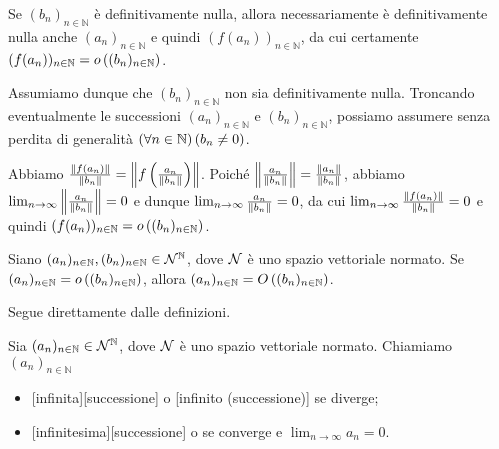 \Proof Se $(b_n)_{n \in \mathbb{N}}$ \`e definitivamente nulla, allora necessariamente \`e definitivamente nulla anche $(a_n)_{n \in \mathbb{N}}$ e quindi $(f(a_n))_{n \in \mathbb{N}}$, da cui certamente $(f(a_n))_{n \in \mathbb{N}} = o \left ( (b_n)_{n \in \mathbb{N}} \right )$.
\par Assumiamo dunque che $(b_n)_{n \in \mathbb{N}}$ non sia definitivamente nulla. Troncando eventualmente le successioni $(a_n)_{n \in \mathbb{N}}$ e $(b_n)_{n \in \mathbb{N}}$, possiamo assumere senza perdita di generalit\`a $\left ( \forall n \in \mathbb{N} \right ) \left ( b_n \neq 0 \right )$.
\par Abbiamo $\frac{\Norm{f(a_n)}}{\Norm{b_n}} = \Norm{f \left ( \frac{a_n}{\Norm{b_n}} \right )}$. Poich\'e $\Norm{\frac{a_n}{\Norm{b_n}}} = \frac{\Norm{a_n}}{\Norm{b_n}}$, abbiamo $\lim_{n \rightarrow \infty} \Norm{\frac{a_n}{\Norm{b_n}}} = 0$ e dunque $\lim_{n \rightarrow \infty} \frac{a_n}{\Norm{b_n}} = 0$, da cui $\lim_{n \rightarrow \infty} \frac{\Norm{f(a_n)}}{\Norm{b_n}} = 0$ e quindi $(f(a_n))_{n \in \mathbb{N}} = o \left ( (b_n)_{n \in \mathbb{N}} \right )$. \EndProof
\begin{Theorem}
	Siano $(a_n)_{n \in \mathbb{N}}, (b_n)_{n \in \mathbb{N}} \in \mathcal{N}^\mathbb{N}$, dove $\mathcal{N}$ \`e uno spazio vettoriale normato. Se $(a_n)_{n \in \mathbb{N}} = o \left ( (b_n)_{n \in \mathbb{N}} \right )$, allora $(a_n)_{n \in \mathbb{N}} = O \left ( (b_n)_{n \in \mathbb{N}} \right )$.
\end{Theorem}
\Proof Segue direttamente dalle definizioni. \EndProof
\begin{Definition}
	Sia $(a_n)_{n \in \mathbb{N}} \in \mathcal{N}^\mathbb{N}$, dove $\mathcal{N}$ \`e uno spazio vettoriale normato. Chiamiamo $(a_n)_{n \in \mathbb{N}}$
	\begin{itemize}
		\item {}[infinita][successione] o [infinito (successione)] se diverge;
		\item {}[infinitesima][successione] o  se converge e $\lim_{n \rightarrow \infty} a_n = 0$.
	\end{itemize}
\end{Definition}
